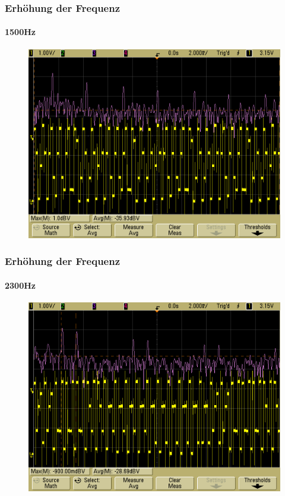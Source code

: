 \begin{frame}
    \frametitle{Erhöhung der Frequenz}
    \framesubtitle{1500Hz}
            \begin{figure}[H]
            \begin{center}
                    \includegraphics[scale=0.2]{./img/oszi/scope_23.png}
            \end{center}
            \end{figure}
\end{frame}
\begin{frame}
    \frametitle{Erhöhung der Frequenz}
    \framesubtitle{2300Hz}
            \begin{figure}[H]
            \begin{center}
                    \includegraphics[scale=0.2]{./img/oszi/scope_24.png}
            \end{center}
            \end{figure}
\end{frame}
